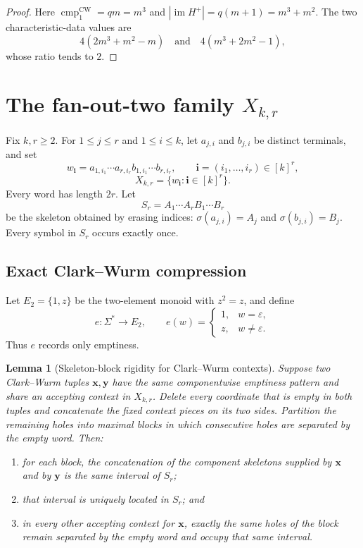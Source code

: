 \documentclass[11pt]{article}
\newtheorem{lemma}[theorem]{Lemma}
\theoremstyle{definition}
\theoremstyle{remark}
\newcommand{\eps}{\varepsilon}
\newcommand{\im}{\operatorname{im}}
\newcommand{\cmp}{\operatorname{cmp}}
\begin{document}
\begin{proof}
Here $\cmp_1^{\mathrm{CW}}=qm=m^3$ and
$|\im H^+|=q(m+1)=m^3+m^2$.  The two characteristic-data values are
\[
 4(2m^3+m^2-m)
 \quad\text{and}\quad
 4(m^3+2m^2-1),
\]
whose ratio tends to $2$.
\end{proof}

\section{The fan-out-two family $X_{k,r}$}
\label{sec:X}

Fix $k,r\ge2$.  For $1\le j\le r$ and $1\le i\le k$, let $a_{j,i}$ and
$b_{j,i}$ be distinct terminals, and set
\[
 w_{\mathbf i}
 =a_{1,i_1}\cdots a_{r,i_r}
  b_{1,i_1}\cdots b_{r,i_r},
 \qquad
 \mathbf i=(i_1,\ldots,i_r)\in[k]^r,
\]
\[
 X_{k,r}=\{w_{\mathbf i}:\mathbf i\in[k]^r\}.
\]
Every word has length $2r$.  Let
\[
 S_r=A_1\cdots A_rB_1\cdots B_r
\]
be the skeleton obtained by erasing indices:
$\sigma(a_{j,i})=A_j$ and $\sigma(b_{j,i})=B_j$.  Every symbol in $S_r$ occurs
exactly once.

\subsection{Exact Clark--Wurm compression}

Let $E_2=\{1,z\}$ be the two-element monoid with $z^2=z$, and define
\[
 e:\Sigma^*\to E_2,
 \qquad
 e(w)=
 \begin{cases}
 1,&w=\eps,\\
 z,&w\ne\eps.
 \end{cases}
\]
Thus $e$ records only emptiness.

\begin{lemma}[Skeleton-block rigidity for Clark--Wurm contexts]
\label{lem:skeleton-rigidity}
Suppose two Clark--Wurm tuples $\mathbf x,\mathbf y$ have the same componentwise
emptiness pattern and share an accepting context in $X_{k,r}$.  Delete every
coordinate that is empty in both tuples and concatenate the fixed context
pieces on its two sides.  Partition the remaining holes into maximal blocks in
which consecutive holes are separated by the empty word.  Then:
\begin{enumerate}[label=(\roman*),leftmargin=*]
\item for each block, the concatenation of the component skeletons supplied by
      $\mathbf x$ and by $\mathbf y$ is the same interval of $S_r$;
\item that interval is uniquely located in $S_r$; and
\item in every other accepting context for $\mathbf x$, exactly the same holes
      of the block remain separated by the empty word and occupy that same
      interval.
\end{enumerate}
\end{lemma}
\end{document}
